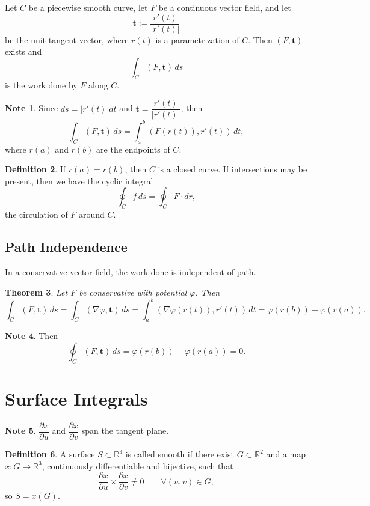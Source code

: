 \documentclass[11pt]{report}
\theoremstyle{definition}
\newtheorem{definition}{Definition}[chapter]
\newtheorem{note}[definition]{Note}
\theoremstyle{plain}
\newtheorem{theorem}[definition]{Theorem}
\theoremstyle{remark}
\newcommand{\R}{\mathbb{R}}
\newcommand{\ip}[2]{\left(#1,#2\right)}
\newcommand{\grad}{\nabla}
\newcommand{\ut}{\mathbf{t}}
\begin{document}
Let $C$ be a piecewise smooth curve, let $F$ be a continuous vector field, and let
\[
\ut:=\frac{r'(t)}{|r'(t)|}
\]
be the unit tangent vector, where $r(t)$ is a parametrization of $C$. Then $\ip{F}{\ut}$ exists and
\[
\int_C \ip{F}{\ut}\,ds
\]
is the work done by $F$ along $C$.

\begin{note}
Since $ds=|r'(t)|dt$ and $\ut=\dfrac{r'(t)}{|r'(t)|}$, then
\[
\int_C \ip{F}{\ut}\,ds = \int_a^b \ip{F(r(t))}{r'(t)}\,dt,
\]
where $r(a)$ and $r(b)$ are the endpoints of $C$.
\end{note}

\begin{definition}
If $r(a)=r(b)$, then $C$ is a closed curve. If intersections may be present, then we have the cyclic integral
\[
\oint_C f\,ds = \oint_C F\cdot dr,
\]
the circulation of $F$ around $C$.
\end{definition}

\subsection{Path Independence}

In a conservative vector field, the work done is independent of path.

\begin{theorem}
Let $F$ be conservative with potential $\varphi$. Then
\[
\int_C \ip{F}{\ut}\,ds
=\int_C \ip{\grad\varphi}{\ut}\,ds
=\int_a^b \ip{\grad\varphi(r(t))}{r'(t)}\,dt
=\varphi(r(b))-\varphi(r(a)).
\]
\end{theorem}

\begin{note}
Then
\[
\oint_C \ip{F}{\ut}\,ds = \varphi(r(b))-\varphi(r(a))=0.
\]
\end{note}

\section{Surface Integrals}

\begin{note}
$\dfrac{\partial x}{\partial u}$ and $\dfrac{\partial x}{\partial v}$ span the tangent plane.
\end{note}

\begin{definition}
A surface $S\subset \R^3$ is called smooth if there exist $G\subset \R^2$ and a map $x:G\to \R^3$, continuously differentiable and bijective, such that
\[
\frac{\partial x}{\partial u}\times \frac{\partial x}{\partial v}\neq 0
\qquad \forall (u,v)\in G,
\]
so $S=x(G)$.
\end{definition}
\end{document}
